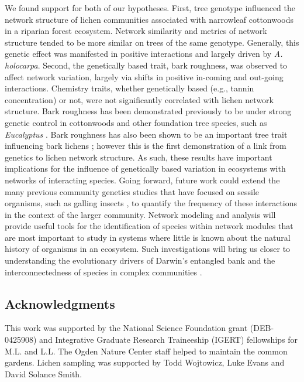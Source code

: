 \documentclass[fleqn,12pt]{olplainarticle}
\begin{document}
We found support for both of our hypotheses. First, tree genotype
influenced the network structure of lichen communities associated with
narrowleaf cottonwoods in a riparian forest ecosystem. Network
similarity and metrics of network structure tended to be more similar
on trees of the same genotype. Generally, this genetic effect was
manifested in positive interactions and largely driven by
\textit{A. holocarpa}. Second, the genetically based trait, bark
roughness, was observed to affect network variation, largely via
shifts in positive in-coming and out-going interactions. Chemistry
traits, whether genetically based (e.g., tannin concentration) or not,
were not significantly correlated with lichen network structure. Bark
roughness has been demonstrated previously to be under strong genetic
control in cottonwoods \citep{Bdeir2017} and other foundation tree
species, such as \textit{Eucalyptus} \citep{Nantongo2020}. Bark
roughness has also been shown to be an important tree trait
influencing bark lichens \citep{Lamit2015a}; however this is the first
demonstration of a link from genetics to lichen network structure.  As
such, these results have important implications for the influence of
genetically based variation in ecosystems with networks of interacting
species. Going forward, future work could extend the many previous
community genetics studies that have focused on sessile organisms,
such as galling insects \citep{Bailey2005ImportanceInteractions,
  Whitham2006a, Crutsinger2014, Smith2011, Keith2017}, to quantify the
frequency of these interactions in the context of the larger
community. Network modeling and analysis will provide useful tools for
the identification of species within network modules that are most
important to study in systems where little is known about the natural
history of organisms in an ecosystem.  Such investigations
will bring us closer to understanding the evolutionary drivers of
Darwin's entangled bank and the interconnectedness of species in
complex communities \citep{Darwin1859, Dattilo2016fix}.



\subsection*{Acknowledgments}

This work was supported by the National Science Foundation grant
(DEB-0425908) and Integrative Graduate Research Traineeship (IGERT)
fellowships for M.L. and L.L. The Ogden Nature Center staff helped to
maintain the common gardens. Lichen sampling was supported by Todd
Wojtowicz, Luke Evans and David Solance Smith.
\end{document}
